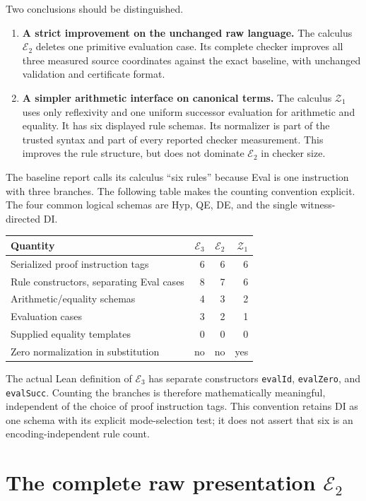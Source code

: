 \documentclass[11pt]{article}
\theoremstyle{definition}\newtheorem{definition}[theorem]{Definition}
\newcommand{\Ethree}{\mathcal E_3}
\newcommand{\Rtwo}{\mathcal E_2}
\newcommand{\Zone}{\mathcal Z_1}
\begin{document}
Two conclusions should be distinguished.
\begin{enumerate}
\item \textbf{A strict improvement on the unchanged raw language.}
The calculus $\Rtwo$ deletes one primitive evaluation case. Its complete
checker improves all three measured source coordinates against the exact
baseline, with unchanged validation and certificate format.
\item \textbf{A simpler arithmetic interface on canonical terms.}
The calculus $\Zone$ uses only reflexivity and one uniform successor
evaluation for arithmetic and equality. It has six displayed rule schemas.
Its normalizer is part of the trusted syntax and part of every reported
checker measurement. This improves the rule structure, but does not
dominate $\Rtwo$ in checker size.
\end{enumerate}

The baseline report calls its calculus ``six rules'' because Eval is one
instruction with three branches. The following table makes the counting
convention explicit. The four common logical schemas are Hyp, QE, DE,
and the single witness-directed DI.
\begin{center}
\begin{tabular}{@{}lrrr@{}}
\toprule
Quantity & $\Ethree$ & $\Rtwo$ & $\Zone$\\
\midrule
Serialized proof instruction tags & 6 & 6 & 6\\
Rule constructors, separating Eval cases & 8 & 7 & 6\\
Arithmetic/equality schemas & 4 & 3 & 2\\
Evaluation cases & 3 & 2 & 1\\
Supplied equality templates & 0 & 0 & 0\\
Zero normalization in substitution & no & no & yes\\
\bottomrule
\end{tabular}
\end{center}
The actual Lean definition of $\Ethree$ has separate constructors
\texttt{evalId}, \texttt{evalZero}, and \texttt{evalSucc}. Counting the
branches is therefore mathematically meaningful, independent of the
choice of proof instruction tags. This convention retains DI as one
schema with its explicit mode-selection test; it does not assert that
six is an encoding-independent rule count.

\section{The complete raw presentation \texorpdfstring{$\Rtwo$}{E2}}
\label{sec:raw}
\end{document}
